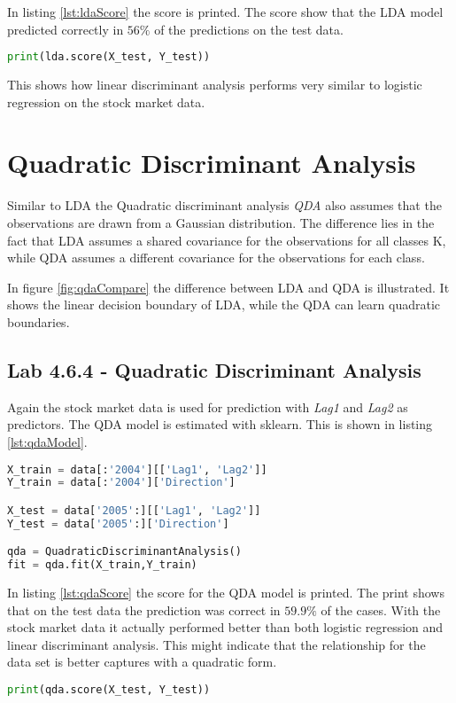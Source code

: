 In listing \ref{lst:ldaScore} the score is printed. The score show that the LDA model predicted correctly in $56\%$ of the predictions on the test data. 
\begin{lstlisting}[language=Python, label=lst:ldaScore, caption=Printing LDA score]
print(lda.score(X_test, Y_test))
\end{lstlisting}

This shows how linear discriminant analysis performs very similar to logistic regression on the stock market data.

\section{Quadratic Discriminant Analysis}
Similar to LDA the Quadratic discriminant analysis \emph{QDA} also assumes that the observations are drawn from a Gaussian distribution. The difference lies in the fact that LDA assumes a shared covariance for the observations for all classes K, while QDA assumes a different covariance for the observations for each class.


In figure \ref{fig:qdaCompare} the difference between LDA and QDA is illustrated. It shows the linear decision boundary of LDA, while the QDA can learn quadratic boundaries.

\subsection{Lab 4.6.4 - Quadratic Discriminant Analysis}
Again the stock market data is used for prediction with \emph{Lag1} and \emph{Lag2} as predictors. The QDA model is estimated with sklearn. This is shown in listing \ref{lst:qdaModel}.

\begin{lstlisting}[language=Python, label=lst:qdaModel, caption=Creating QDA model]
X_train = data[:'2004'][['Lag1', 'Lag2']]
Y_train = data[:'2004']['Direction']

X_test = data['2005':][['Lag1', 'Lag2']]
Y_test = data['2005':]['Direction']

qda = QuadraticDiscriminantAnalysis()
fit = qda.fit(X_train,Y_train)
\end{lstlisting}

In listing \ref{lst:qdaScore} the score for the QDA model is printed. The print shows that on the test data the prediction was correct in $59.9\%$ of the cases. With the stock market data it actually performed better than both logistic regression and linear discriminant analysis. This might indicate that the relationship for the data set is better captures with a quadratic form.
\begin{lstlisting}[language=Python, label=lst:qdaScore, caption=Printing qda score]
print(qda.score(X_test, Y_test))
\end{lstlisting}

